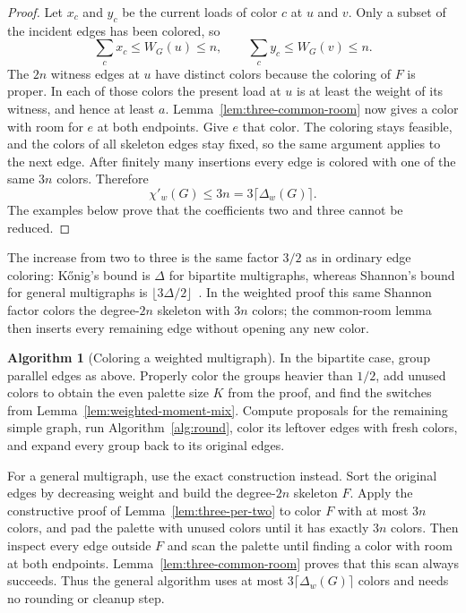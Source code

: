 \documentclass[11pt]{article}
\theoremstyle{definition}\newtheorem{algorithm}{Algorithm}[section]
\numberwithin{equation}{section}
\theoremstyle{remark}\newtheorem*{remark}{Remark}
\begin{document}
\begin{proof}
Let $x_c$ and $y_c$ be the current loads of color $c$ at $u$ and $v$.
Only a subset of the incident edges has been colored, so
\[
 \sum_c x_c\le W_G(u)\le n,
 \qquad
 \sum_c y_c\le W_G(v)\le n.                         \tag{2}
\]
The $2n$ witness edges at $u$ have distinct colors because the coloring
of $F$ is proper.  In each of those colors the present load at $u$ is
at least the weight of its witness, and hence at least $a$.
Lemma~\ref{lem:three-common-room} now gives a color with room for $e$
at both endpoints.  Give $e$ that color.  The coloring stays feasible,
and the colors of all skeleton edges stay fixed, so the same argument
applies to the next edge.  After finitely many insertions every edge is
colored with one of the same $3n$ colors.  Therefore
\[
 \chi'_w(G)\le3n=3\lceil\Delta_w(G)\rceil.
\]
The examples below prove that the coefficients two and three cannot be
reduced.
\end{proof}

The increase from two to three is the same factor $3/2$ as in ordinary
edge coloring: K\H{o}nig's bound is $\Delta$ for bipartite multigraphs,
whereas Shannon's bound for general multigraphs is
$\lfloor3\Delta/2\rfloor$~\cite{Shannon49}.  In the weighted proof this
same Shannon factor colors the degree-$2n$ skeleton with $3n$ colors;
the common-room lemma then inserts every remaining edge without opening
any new color.


\begin{algorithm}[Coloring a weighted multigraph]\label{alg:total}
In the bipartite case, group parallel edges as above. Properly color the
groups heavier than $1/2$, add unused colors to obtain the even palette
size $K$ from the proof, and find the switches from
Lemma~\ref{lem:weighted-moment-mix}. Compute proposals for the remaining
simple graph, run Algorithm~\ref{alg:round}, color its leftover edges
with fresh colors, and expand every group back to its original edges.

For a general multigraph, use the exact construction instead.  Sort the
original edges by decreasing weight and build the degree-$2n$ skeleton
$F$.  Apply the constructive proof of Lemma~\ref{lem:three-per-two} to
color $F$ with at most $3n$ colors, and pad the palette with unused
colors until it has exactly $3n$ colors.  Then inspect every edge outside $F$ and
scan the palette until finding a color with room at both endpoints.
Lemma~\ref{lem:three-common-room} proves that this scan always succeeds.
Thus the general algorithm uses at most
$3\lceil\Delta_w(G)\rceil$ colors and needs no rounding or cleanup step.
\end{algorithm}
\end{document}
